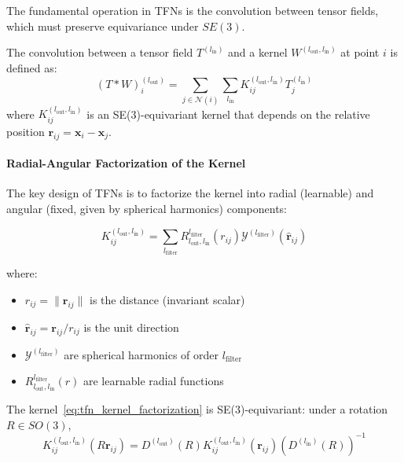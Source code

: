 The fundamental operation in TFNs is the convolution between tensor fields, which must preserve equivariance under $SE(3)$.

\begin{definition}\label{def:tfn_convolution}
The convolution between a tensor field $T^{(l_{\text{in}})}$ and a kernel $W^{(l_{\text{out}}, l_{\text{in}})}$ at point $i$ is defined as:
\begin{equation}\label{eq:tfn_conv}
(T * W)_i^{(l_{\text{out}})} = \sum_{j \in \mathcal{N}(i)} \sum_{l_{\text{in}}} K_{ij}^{(l_{\text{out}}, l_{\text{in}})} T_j^{(l_{\text{in}})}
\end{equation}
where $K_{ij}^{(l_{\text{out}}, l_{\text{in}})}$ is an SE(3)-equivariant kernel that depends on the relative position $\mathbf{r}_{ij} = \mathbf{x}_i - \mathbf{x}_j$.
\end{definition}

\paragraph{Radial-Angular Factorization of the Kernel}

The key design of TFNs is to factorize the kernel into radial (learnable) and angular (fixed, given by spherical harmonics) components:

\begin{equation}\label{eq:tfn_kernel_factorization}
K_{ij}^{(l_{\text{out}}, l_{\text{in}})} = \sum_{l_{\text{filter}}} R^{l_{\text{filter}}}_{l_{\text{out}}, l_{\text{in}}}(r_{ij}) \mathcal{Y}^{(l_{\text{filter}})}(\hat{\mathbf{r}}_{ij})
\end{equation}

where:
\begin{itemize}
    \item $r_{ij} = \|\mathbf{r}_{ij}\|$ is the distance (invariant scalar)
    \item $\hat{\mathbf{r}}_{ij} = \mathbf{r}_{ij} / r_{ij}$ is the unit direction
    \item $\mathcal{Y}^{(l_{\text{filter}})}$ are spherical harmonics of order $l_{\text{filter}}$
    \item $R^{l_{\text{filter}}}_{l_{\text{out}}, l_{\text{in}}}(r)$ are learnable radial functions
\end{itemize}

\begin{proposition}\label{prop:tfn_kernel_equivariance}
The kernel~\eqref{eq:tfn_kernel_factorization} is SE(3)-equivariant: under a rotation $R \in SO(3)$,
\begin{equation}
K_{ij}^{(l_{\text{out}}, l_{\text{in}})}(R\mathbf{r}_{ij}) = D^{(l_{\text{out}})}(R) K_{ij}^{(l_{\text{out}}, l_{\text{in}})}(\mathbf{r}_{ij}) (D^{(l_{\text{in}})}(R))^{-1}
\end{equation}
\end{proposition}

